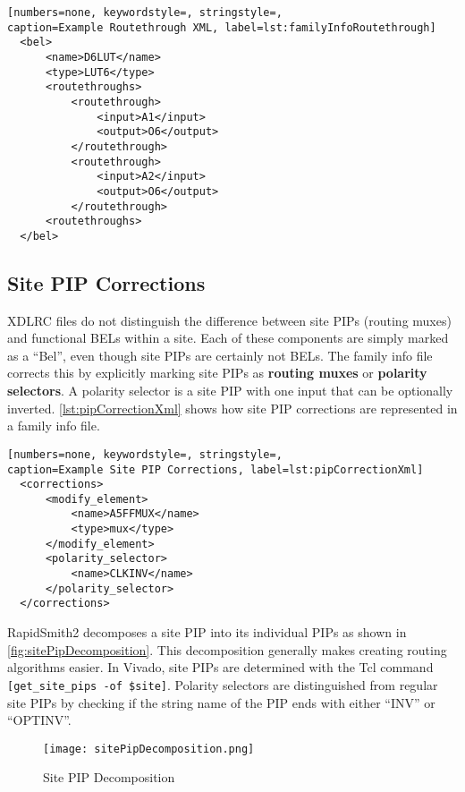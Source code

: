 \begin{lstlisting}[numbers=none, keywordstyle=, stringstyle=,
caption=Example Routethrough XML, label=lst:familyInfoRoutethrough]
  <bel>
      <name>D6LUT</name>
      <type>LUT6</type>
      <routethroughs>
          <routethrough>
              <input>A1</input>
              <output>O6</output>
          </routethrough>
          <routethrough>
              <input>A2</input>
              <output>O6</output>
          </routethrough>
      <routethroughs>
  </bel>
\end{lstlisting}

\subsection{Site PIP Corrections}
XDLRC files do not distinguish the difference between site PIPs (routing muxes)
and functional BELs within a site. Each of these components are simply marked
as a ``Bel'', even though site PIPs are certainly not BELs. The family info file
corrects this by explicitly marking site PIPs as \textbf{routing muxes} or
\textbf{polarity selectors}. A polarity selector is a site PIP with one
input that can be optionally inverted. \autoref{lst:pipCorrectionXml} shows how
site PIP corrections are represented in a family info file.

\begin{lstlisting}[numbers=none, keywordstyle=, stringstyle=,
caption=Example Site PIP Corrections, label=lst:pipCorrectionXml]
  <corrections>
      <modify_element> 
          <name>A5FFMUX</name> 
          <type>mux</type> 
      </modify_element>
      <polarity_selector> 
          <name>CLKINV</name> 
      </polarity_selector>
  </corrections>
\end{lstlisting}

\noindent RapidSmith2 decomposes a site PIP into its individual PIPs as shown in
\autoref{fig:sitePipDecomposition}. This decomposition generally makes creating
routing algorithms easier. In Vivado, site PIPs are determined with the Tcl
command \texttt{[get\_site\_pips -of \$site]}. Polarity selectors are
distinguished from regular site PIPs by checking if the string name of the PIP
ends with either ``INV'' or ``OPTINV''.
  
\begin{figure}[H]
  \centering
  \texttt{[image: sitePipDecomposition.png]}
  \caption{Site PIP Decomposition}
  \label{fig:sitePipDecomposition}
\end{figure}

